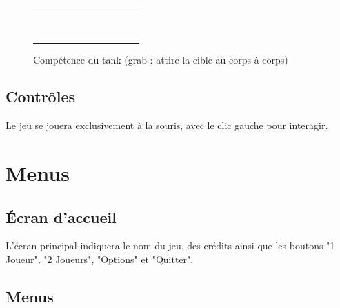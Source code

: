 \documentclass[a4paper]{scrreprt}
\begin{document}
\begin{figure}
    \centering
    \begin{tabular}{|c|c|c|c|c|c|c|c|c|c|c|}
        \hline
        &&&&&&&&&&\\ \hline  
        &&&&&&&&&&\\ \hline 
        &&&&&\cellcolor{cgreen}&&&&&\\ \hline
        &&&&&\cellcolor{cgreen}&&&&&\\ \hline
        &&&&&&&&&&\\ \hline
        &&\cellcolor{cgreen}&\cellcolor{cgreen}&&\cellcolor{yellow}&&\cellcolor{cgreen}&\cellcolor{cgreen}&&\\ \hline
        &&&&&&&&&&\\ \hline
        &&&&&\cellcolor{cgreen}&&&&&\\ \hline
        &&&&&\cellcolor{cgreen}&&&&&\\ \hline
        &&&&&&&&&&\\ \hline
        &&&&&&&&&&\\ \hline
        
    \end{tabular}
    \caption{Compétence du tank (grab : attire la cible au corps-à-corps)}
    \label{fig:tankcomp}
\end{figure}

\section{Contrôles}
Le jeu se jouera exclusivement à la souris, avec le clic gauche pour interagir.



\chapter{Menus}

\section{\'Ecran d'accueil}

L'écran principal indiquera le nom du jeu, des crédits ainsi que les boutons "1 Joueur", "2 Joueurs", "Options" et "Quitter".

\section{Menus}
\end{document}
